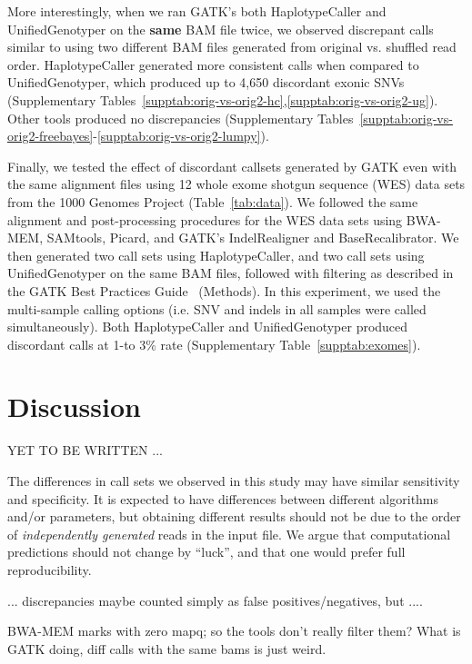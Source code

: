 \documentclass[10pt,a4paper]{article}
\begin{document}
More interestingly, when we ran GATK's both HaplotypeCaller and UnifiedGenotyper on the {\bf same} BAM file twice, we observed discrepant calls similar to using two different BAM files generated from original vs. shuffled read order. HaplotypeCaller generated more consistent calls when compared to UnifiedGenotyper, which produced up to 4,650 discordant exonic SNVs (Supplementary Tables~\ref{supptab:orig-vs-orig2-hc},\ref{supptab:orig-vs-orig2-ug}). Other tools produced no discrepancies (Supplementary Tables~\ref{supptab:orig-vs-orig2-freebayes}-\ref{supptab:orig-vs-orig2-lumpy}).

Finally, we tested the effect of discordant callsets generated by GATK even with the same alignment files using 12 whole exome shotgun sequence (WES) data sets from the 1000 Genomes Project (Table~\ref{tab:data}). We followed the same alignment and post-processing procedures for the WES data sets using BWA-MEM, SAMtools, Picard, and GATK's IndelRealigner and BaseRecalibrator. We then generated two call sets using HaplotypeCaller, and two call sets using UnifiedGenotyper on the same BAM files, followed with filtering as described in the GATK Best Practices Guide~\cite{VanderAuwera2013} (Methods). In this experiment, we used the multi-sample calling options (i.e. SNV and indels in all samples were called simultaneously). Both HaplotypeCaller and UnifiedGenotyper produced discordant calls at 1-to 3\% rate
(Supplementary Table~\ref{supptab:exomes}). 

\section{Discussion}

YET TO BE WRITTEN ...

The differences in call sets we observed in this study 
may have similar sensitivity and specificity. It is expected to
have differences between different algorithms and/or parameters, but
obtaining different results should not be due to the order of {\it independently generated} reads in the input file. 
We argue that computational predictions should not change by ``luck'', and that 
one would prefer full reproducibility. 

... discrepancies maybe counted simply as false positives/negatives, but ....

BWA-MEM marks with zero mapq; so the tools don't really filter them? What is GATK doing, diff calls with the same bams is just weird.

\small






\end{document}

